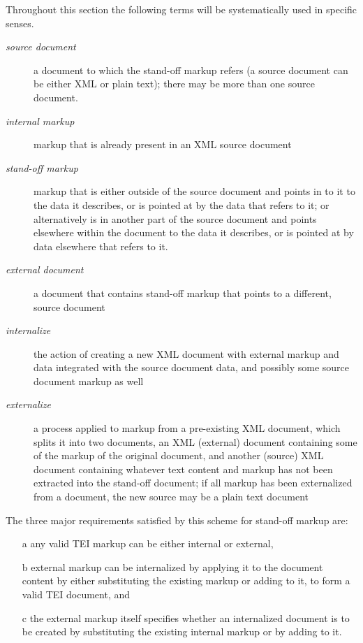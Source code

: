 Throughout this section the following terms will be systematically used in specific senses. \begin{description}

\item[{\textit{source document}}]a document to which the stand-off markup refers (a source document can be either XML or plain text); there may be more than one source document.
\item[{\textit{internal markup}}]markup that is already present in an XML source document
\item[{\textit{stand-off markup}}]markup that is either outside of the source document and points in to it to the data it describes, or is pointed at by the data that refers to it; or alternatively is in another part of the source document and points elsewhere within the document to the data it describes, or is pointed at by data elsewhere that refers to it.
\item[{\textit{external document}}]a document that contains stand-off markup that points to a different, source document
\item[{\textit{internalize}}]the action of creating a new XML document with external markup and data integrated with the source document data, and possibly some source document markup as well
\item[{\textit{externalize}}]a process applied to markup from a pre-existing XML document, which splits it into two documents, an XML (external) document containing some of the markup of the original document, and another (source) XML document containing whatever text content and markup has not been extracted into the stand-off document; if all markup has been externalized from a document, the new source may be a plain text document
\end{description} \par
The three major requirements satisfied by this scheme for stand-off markup are: \begin{enumerate}
\item[a] any valid TEI markup can be either internal or external,
\item[b] external markup can be internalized by applying it to the document content by either substituting the existing markup or adding to it, to form a valid TEI document, and
\item[c] the external markup itself specifies whether an internalized document is to be created by substituting the existing internal markup or by adding to it.
\end{enumerate}
